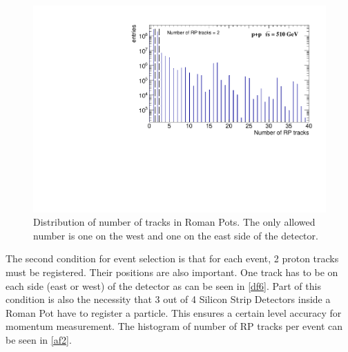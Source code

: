 \FloatBarrier
\begin{figure}[ht]
    \centering
    \includegraphics[width=1\textwidth]{figures/NumberRPTracks.pdf}
    \caption[Distribution of number of tracks in Roman Pot system]{Distribution of number of tracks in Roman Pots. The only allowed number is one on the west and one on the east side of the detector.}
    \label{af2}
\end{figure}
\FloatBarrier
The second condition for event selection is that for each event, 2 proton tracks must be registered. Their positions are also important. One track has to be on each side (east or west) of the detector as can be seen in \autoref{df6}. Part of this condition is also the necessity that 3 out of 4 Silicon Strip Detectors inside a Roman Pot have to register a particle. This ensures a certain level accuracy for momentum measurement. The histogram of number of RP tracks per event can be seen in \autoref{af2}. 
